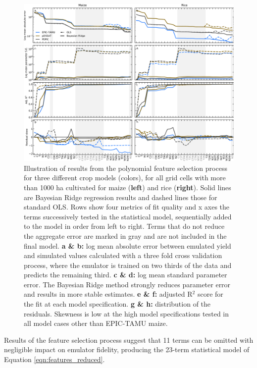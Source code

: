 \documentclass[gmdd]{copernicus} %
\begin{document}
\begin{figure}[ht]
\centering
   \includegraphics[width=15cm]{figures/model_select_maize_rice.png}
    \caption{
    Illustration of results from the polynomial feature selection process for three different crop models (colors), for all grid cells with more than 1000 ha cultivated for maize (\textbf{left}) and rice (\textbf{right}). 
    Solid lines are Bayesian Ridge regression results and dashed lines those for standard OLS. Rows show four metrics of fit quality and x axes the terms successively tested in the statistical model, sequentially added to the model in order from left to right.
    Terms that do not reduce the aggregate error are marked in {\color{dark-gray} gray} and are not included in the final model. 
    \textbf{a \& b:} log mean absolute error between emulated yield and simulated values calculated with a three fold cross validation process, where the emulator is trained on two thirds of the data and predicts the remaining third.
    \textbf{c \& d:} log mean standard parameter error. The Bayesian Ridge method strongly reduces parameter error and results in more stable estimates. 
    \textbf{e \& f:} adjusted R$^2$ score for the fit at each model specification. 
    \textbf{g \& h:} distribution of the residuals. Skewness is low at the high model specifications tested in all model cases other than EPIC-TAMU maize.
    }
   \label{fig:features}
\end{figure}

Results of the feature selection process suggest that 11 terms can be omitted with negligible impact on emulator fidelity, producing the 23-term statistical model of Equation \ref{eqn:features_reduced}.
\end{document}
